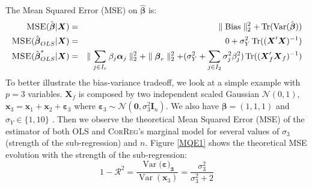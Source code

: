 \documentclass[11pt,a4paper]{article}
\begin{document}
		  
	 The Mean Squared Error (\textsc{MSE}) on $\hat{\boldsymbol{\beta}}$ is:
	\begin{eqnarray}
		\textsc{MSE}(\hat{\boldsymbol{\beta}}|\boldsymbol{X})&=&\parallel \operatorname{Bias}\parallel_2^2+\operatorname{Tr}(\operatorname{Var}(\hat{\boldsymbol{\beta}})) \\
			\textsc{MSE}(\hat{\boldsymbol{\beta}}_{OLS}|\boldsymbol{X})&=& 0 + \sigma_Y^2 \operatorname{Tr}((\boldsymbol{X}'\boldsymbol{X})^{-1}) %
			 \\
			\textsc{MSE}(\hat{\boldsymbol{\beta}}^*_{OLS}|\boldsymbol{X})&=& \parallel\sum_{j \in I_r}\beta_{j}\boldsymbol{\alpha}_j \parallel_2^2 +\parallel \boldsymbol{\beta}_r\parallel^2_2 + (\sigma^2_Y+\sum_{j \in I_2}\sigma^2_{j}\beta_{j}^2 ) \operatorname{Tr}((\boldsymbol{X}_f' \boldsymbol{X}_f)^{-1})
	\end{eqnarray}	 
	To better illustrate the bias-variance tradeoff, we look at a simple example with $p=3$ variables. $\boldsymbol{X}_f$ is composed by two independent scaled Gaussian $\mathcal{N}(0,1)$, $\boldsymbol{x}_3=\boldsymbol{x}_1+\boldsymbol{x}_2+\boldsymbol{\varepsilon}_3$ where $\boldsymbol{\varepsilon}_3\sim{\mathcal{N}(\boldsymbol{0},\sigma_3^2\boldsymbol{I}_n)}$. We also have $\boldsymbol{\beta}=(1,1,1)$ and $\sigma_Y \in \{1,10\}$  . Then we observe the theoretical Mean Squared Error (MSE) of the estimator of both OLS and \textsc{CorReg}'s marginal  model for several values of $\sigma_3$ (strength of the sub-regression) and $n$. Figure \ref{MQE1} shows the theoretical MSE evolution with the strength of the sub-regression:
	\begin{equation}
		1-\mathcal{R}^2=\frac{\operatorname{Var}(\boldsymbol{\varepsilon)_3}}{\operatorname{Var}(\boldsymbol{x}_3)}=\frac{\sigma_3^2}{\sigma_3^2+2}
	\end{equation}
	
\end{document}
